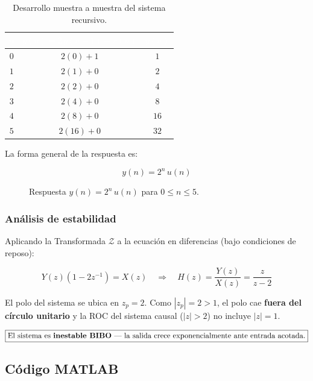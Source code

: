 \documentclass[../Main_Include.tex]{subfiles}
\begin{document}
\begin{table}[H]
\centering
\renewcommand{\arraystretch}{1.4}
\begin{tabular}{ccc}
\toprule
\rowcolor{azulprinc}
\textcolor{white}{\textbf{$n$}} &
\textcolor{white}{\textbf{$y(n) = 2\,y(n-1) + x(n)$}} &
\textcolor{white}{\textbf{$y(n)$}} \\
\midrule
\rowcolor{grisclaro}
$0$ & $2(0) + 1$ & $1$ \\
$1$ & $2(1) + 0$ & $2$ \\
\rowcolor{grisclaro}
$2$ & $2(2) + 0$ & $4$ \\
$3$ & $2(4) + 0$ & $8$ \\
\rowcolor{grisclaro}
$4$ & $2(8) + 0$ & $16$ \\
$5$ & $2(16) + 0$ & $32$ \\
\bottomrule
\end{tabular}
\caption{Desarrollo muestra a muestra del sistema recursivo.}
\end{table}

La forma general de la respuesta es:

\[
    \boxed{y(n) = 2^n\, u(n)}
\]

\begin{figure}[H]
    \centering
    \caption{Respuesta $y(n) = 2^n\,u(n)$ para $0 \le n \le 5$.}
\end{figure}

\subsubsection*{Análisis de estabilidad}

Aplicando la Transformada $\mathcal{Z}$ a la ecuación en diferencias
(bajo condiciones de reposo):

\[
    Y(z)\!\left(1 - 2z^{-1}\right) = X(z)
    \quad\Longrightarrow\quad
    H(z) = \frac{Y(z)}{X(z)} = \frac{z}{z - 2}
\]

El polo del sistema se ubica en $z_p = 2$. Como $|z_p| = 2 > 1$,
el polo cae \textbf{fuera del círculo unitario} y la ROC del sistema
causal ($|z| > 2$) no incluye $|z| = 1$.

\[
    \boxed{\text{El sistema es \textbf{inestable BIBO} —
    la salida crece exponencialmente ante entrada acotada.}}
\]

\subsection*{Código MATLAB}
\end{document}
